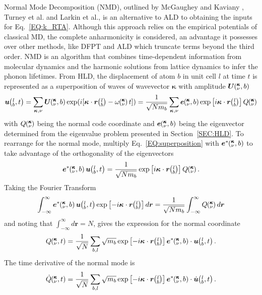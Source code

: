 Normal Mode Decomposition (NMD), outlined by McGaughey and Kaviany \cite{PhysRevB.71.184305}, Turney et al.\cite {PhysRevB.81.081411} and Larkin et al.,\cite{jason_inpress} is an alternative to ALD to obtaining the inputs for Eq.~\ref{EQ:k_RTA}. Although this approach relies on the empirical potentials of classical MD, the complete anharmonicity is considered, an advantage it possesses over other methods, like DFPT and ALD which truncate terms beyond the third order. NMD is an algorithm that combines time-dependent information from molecular dynamics and the harmonic solutions from lattice dynamics to infer the phonon lifetimes. From HLD, the displacement of atom $b$ in unit cell $l$ at time $t$ is represented as a superposition of waves of wavevector $\bm{\kappa}$ with amplitude $\bm{U}\mspace{-4.0mu}\left(\mspace{-8.0mu} \begin{smallmatrix} &\pmb{\kappa} \\ &\nu \end{smallmatrix} \mspace{-2.0mu},b\right)$
%
\begin{equation}\label{EQ:superposition}
\bm{u}\lbt=\sum_{\bm{\kappa},\nu}\bm{U}\kvb \exp(i[\bm{\kappa}\cdot\bm{r}\lb-\omega\kv t])=\frac{1}{\sqrt{Nm_b}}\sum_{\bm{\kappa},\nu}\bm{e}\kvb \exp \left[ i\bm{\kappa}\cdot\bm{r}\lb \right]Q\kv
\end{equation}
%
with $Q\mspace{-4.0mu}\left(\mspace{-8.0mu} \begin{smallmatrix}&\pmb{\kappa} \\&\nu\end{smallmatrix} \mspace{-3.0mu}\right)$ being the normal code coordinate and $\bm{e}\mspace{-4.0mu}\left(\mspace{-8.0mu} \begin{smallmatrix} &\pmb{\kappa} \\ &\nu \end{smallmatrix} \mspace{-2.0mu},b\right)$ being the eigenvector determined from the eigenvalue problem presented in Section~\ref{SEC:HLD}. To rearrange for the normal mode, multiply Eq.~\ref{EQ:superposition} with $\bm{e}^*\mspace{-4.0mu}\left(\mspace{-8.0mu} \begin{smallmatrix} &\pmb{\kappa} \\ &\nu \end{smallmatrix} \mspace{-2.0mu},b\right)$ to take advantage of the orthogonality of the eigenvectors
%
\begin{equation}
\bm{e}^*\kvb\bm{u}\lbt=\frac{1}{\sqrt{Nm_b}}\exp \left[ i\bm{\kappa}\cdot\bm{r}\lb \right] Q\kv.
\end{equation}
%
Taking the Fourier Transform
%
\begin{equation}
\int_{-\infty}^{\infty}\bm{e}^*\kvb\bm{u}\lbt \exp \left[-i\bm{\kappa}\cdot\bm{r}\lb \right ]d\bm{r}=\frac{1}{\sqrt{Nm_b}}\int_{-\infty}^{\infty}Q\kv d\bm{r}
\end{equation}
%
and noting that $\int_{-\infty}^{\infty}d\bm{r}=N$, gives the expression for the normal coordinate
%
\begin{equation}
Q\kvt=\frac{1}{\sqrt{N}}\sum_{b,l}\sqrt{m_b}\exp \left[-i\bm{\kappa}\cdot\bm{r}\lb \right] \bm{e}^*\kvb\cdot\bm{u}\lbt.
\end{equation}
%
The time derivative of the normal mode is
%
\begin{equation}\label{EQ:qdot}
\dot{Q}\kvt=\frac{1}{\sqrt{N}}\sum_{b,l}\sqrt{m_b}\exp \left[-i\bm{\kappa}\cdot\bm{r}\lb \right]\bm{e}^*\kvb\cdot\dot{\bm{u}}\lbt.
\end{equation}
